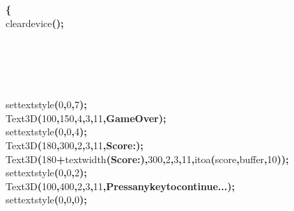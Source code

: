 \documentclass[a4paper, 10pt]{article}
\newcommand\SPC{\hspace*{0.6em}}
\newcommand\QOT{\mbox{\char 34}}
\newcommand{\CppAIdentifier}[1]{#1}
\newcommand{\CppANumber}[1]{\textcolor[rgb]{0.5,0,0.5}{#1}}
\newcommand{\CppASpace}[1]{\colorbox[rgb]{1,1,1}{#1}}
\newcommand{\CppAString}[1]{\textbf{\textcolor[rgb]{0,0,1}{#1}}}
\newcommand{\CppASymbol}[1]{\textbf{\textcolor[rgb]{1,0,0}{#1}}}
\begin{document}
\begin{ttfamily}
\CppASpace{\SPC }\CppASymbol{\{}\\
\CppASpace{\SPC \SPC }\CppAIdentifier{cleardevice}\CppASymbol{(}\CppASymbol{)}\CppASymbol{;}\\
\\
\\
\\
\\
\\
\CppASpace{\SPC \SPC }\CppAIdentifier{settextstyle}\CppASymbol{(}\CppANumber{0}\CppASymbol{,}\CppANumber{0}\CppASymbol{,}\CppANumber{7}\CppASymbol{)}\CppASymbol{;}\\
\CppASpace{\SPC \SPC }\CppAIdentifier{Text3D}\CppASymbol{(}\CppANumber{100}\CppASymbol{,}\CppANumber{150}\CppASymbol{,}\CppANumber{4}\CppASymbol{,}\CppANumber{3}\CppASymbol{,}\CppANumber{11}\CppASymbol{,}\CppAString{\QOT Game\SPC Over\QOT }\CppASymbol{)}\CppASymbol{;}\\
\CppASpace{\SPC \SPC }\CppAIdentifier{settextstyle}\CppASymbol{(}\CppANumber{0}\CppASymbol{,}\CppANumber{0}\CppASymbol{,}\CppANumber{4}\CppASymbol{)}\CppASymbol{;}\\
\CppASpace{\SPC \SPC }\CppAIdentifier{Text3D}\CppASymbol{(}\CppANumber{180}\CppASymbol{,}\CppANumber{300}\CppASymbol{,}\CppANumber{2}\CppASymbol{,}\CppANumber{3}\CppASymbol{,}\CppANumber{11}\CppASymbol{,}\CppAString{\QOT Score\SPC :\SPC \QOT }\CppASymbol{)}\CppASymbol{;}\\
\CppASpace{\SPC \SPC }\CppAIdentifier{Text3D}\CppASymbol{(}\CppANumber{180}\CppASymbol{+}\CppAIdentifier{textwidth}\CppASymbol{(}\CppAString{\QOT Score\SPC :\SPC \QOT }\CppASymbol{)}\CppASymbol{,}\CppANumber{300}\CppASymbol{,}\CppANumber{2}\CppASymbol{,}\CppANumber{3}\CppASymbol{,}\CppANumber{11}\CppASymbol{,}\CppAIdentifier{itoa}\CppASymbol{(}\CppAIdentifier{score}\CppASymbol{,}\CppAIdentifier{buffer}\CppASymbol{,}\CppANumber{10}\CppASymbol{)}\CppASymbol{)}\CppASymbol{;}\\
\CppASpace{\SPC \SPC }\CppAIdentifier{settextstyle}\CppASymbol{(}\CppANumber{0}\CppASymbol{,}\CppANumber{0}\CppASymbol{,}\CppANumber{2}\CppASymbol{)}\CppASymbol{;}\\
\CppASpace{\SPC \SPC }\CppAIdentifier{Text3D}\CppASymbol{(}\CppANumber{100}\CppASymbol{,}\CppANumber{400}\CppASymbol{,}\CppANumber{2}\CppASymbol{,}\CppANumber{3}\CppASymbol{,}\CppANumber{11}\CppASymbol{,}\CppAString{\QOT Press\SPC any\SPC key\SPC to\SPC continue...\QOT }\CppASymbol{)}\CppASymbol{;}\\
\CppASpace{\SPC \SPC }\CppAIdentifier{settextstyle}\CppASymbol{(}\CppANumber{0}\CppASymbol{,}\CppANumber{0}\CppASymbol{,}\CppANumber{0}\CppASymbol{)}\CppASymbol{;}\\

\end{ttfamily}
\end{document}
